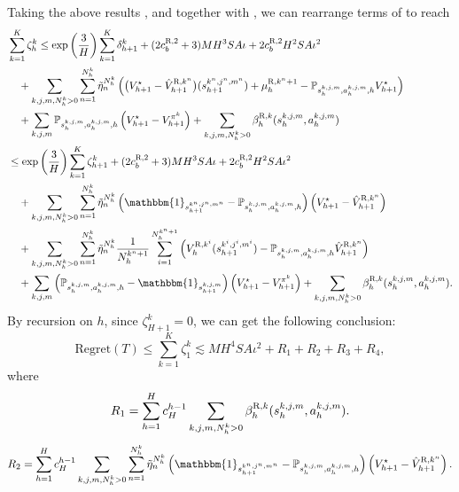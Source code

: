 \documentclass{article}
\newcommand{\R}{\textnormal{R}}
\begin{document}
Taking the above results ,  and  together with , we can rearrange terms of  to reach
\begin{align*}
    &\sum_{k=1}^K \zeta_h^k 
    \leq \exp\left(\frac{3}{H}\right)\sum_{k=1}^K \delta_{h+1}^k + (2c_b^{\R,2}+3)MH^3SA\iota + 2c_b^{\R,2}H^2SA\iota^2  \nonumber\\
    &\quad+ \sum_{k,j,m,N_h^k >0}\sum_{n=1}^{N_h^k} \Tilde{\eta}_n^{N_h^k}\left( \big(V_{h+1}^{\star}-\hat{V}_{h+1}^{\R,k^n}\big)(s_{h+1}^{k^n,j^n,m^n})   + \mu_h^{\R,k^n+1}- \mathbb{P}_{s_h^{k,j,m}, a_h^{k,j,m},h} V_{h+1}^{\star}\right) \nonumber\\
    &\quad + \sum_{k,j,m}\mathbb{P}_{s_h^{k,j,m}, a_h^{k,j,m},h}\left(V_{h+1}^{\star} - V_{h+1}^{\pi^k}\right)+  \sum_{k,j,m,N_h^k >0}\beta_h^{\R,k}(s_h^{k,j,m}, a_h^{k,j,m}) \nonumber\\
    &\leq \exp\left(\frac{3}{H}\right)\sum_{k=1}^K \zeta_{h+1}^k+ (2c_b^{\R,2}+3) MH^3SA\iota + 2c_b^{\R,2}H^2SA\iota^2  \nonumber\\
    &\quad+ \sum_{k,j,m,N_h^k >0}\sum_{n=1}^{N_h^k} \Tilde{\eta}_n^{N_h^k}\left(\mathbbm{1}_{s_{h+1}^{k^n,j^n,m^n}}-\mathbb{P}_{s_h^{k,j,m}, a_h^{k,j,m},h}\right)\left(V_{h+1}^{\star}-\hat{V}_{h+1}^{\R,k^n}\right)   \nonumber\\
    &\quad + \sum_{k,j,m,N_h^k >0}\sum_{n=1}^{N_h^k} \Tilde{\eta}_n^{N_h^k}\frac{1}{N_h^{k^n+1}} \sum_{i=1}^{N_h^{k^n+1}}\left(V_h^{\R,k^i}(s_{h+1}^{k^i,j^i,m^i})-\mathbb{P}_{s_h^{k,j,m}, a_h^{k,j,m},h}\hat{V}_{h+1}^{\R,k^n}\right) \nonumber\\
    &\quad + \sum_{k,j,m}\left(\mathbb{P}_{s_h^{k,j,m}, a_h^{k,j,m},h}-\mathbbm{1}_{s_{h+1}^{k,j,m}}\right)\left(V_{h+1}^{\star} - V_{h+1}^{\pi^k}\right)+  \sum_{k,j,m,N_h^k >0}\beta_h^{\R,k}(s_h^{k,j,m}, a_h^{k,j,m}).
\end{align*}
By recursion on $h$, since $\zeta_{H+1}^k = 0$, we can get the following conclusion:
$$\mbox{Regret}(T) \leq \sum_{k=1}^K \zeta_1^k \lesssim MH^4SA\iota^2 +R_1+R_2+R_3+R_4,$$
where 
\begin{equation*}
\label{R1}
    R_1 = \sum_{h=1}^H c_H^{h-1} \sum_{k,j,m,N_h^k >0}\beta_h^{\R,k}(s_h^{k,j,m}, a_h^{k,j,m}).
\end{equation*}
\begin{equation*}
\label{R2}
    R_2 = \sum_{h=1}^H c_H^{h-1}\sum_{k,j,m,N_h^k >0}\sum_{n=1}^{N_h^k} \Tilde{\eta}_n^{N_h^k}\left(\mathbbm{1}_{s_{h+1}^{k^n,j^n,m^n}}-\mathbb{P}_{s_h^{k,j,m}, a_h^{k,j,m},h}\right)\left(V_{h+1}^{\star}-\hat{V}_{h+1}^{\R,k^n}\right).
\end{equation*}
\end{document}
